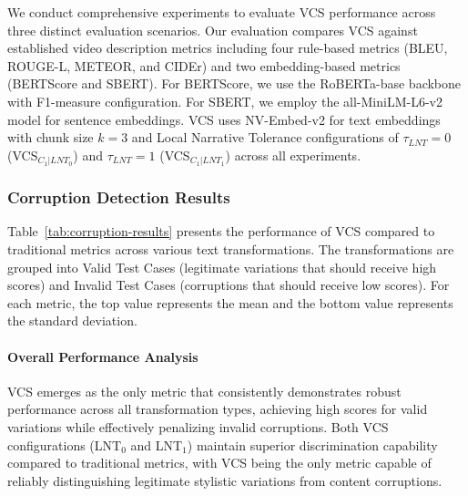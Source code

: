 \documentclass[main.tex]{subfiles}
\begin{document}
We conduct comprehensive experiments to evaluate VCS performance across three distinct evaluation scenarios. Our evaluation compares VCS against established video description metrics including four rule-based metrics (BLEU, ROUGE-L, METEOR, and CIDEr) and two embedding-based metrics (BERTScore and SBERT). For BERTScore, we use the RoBERTa-base backbone with F1-measure configuration. For SBERT, we employ the all-MiniLM-L6-v2 model for sentence embeddings. VCS uses NV-Embed-v2 for text embeddings with chunk size $k=3$ and Local Narrative Tolerance configurations of $\tau_{LNT}=0$ (VCS$_{C_1|LNT_0}$) and $\tau_{LNT}=1$ (VCS$_{C_1|LNT_1}$) across all experiments.

\subsubsection{Corruption Detection Results}

Table~\ref{tab:corruption-results} presents the performance of VCS compared to traditional metrics across various text transformations. The transformations are grouped into Valid Test Cases (legitimate variations that should receive high scores) and Invalid Test Cases (corruptions that should receive low scores). For each metric, the top value represents the mean and the bottom value represents the standard deviation.

\paragraph{Overall Performance Analysis}
VCS emerges as the only metric that consistently demonstrates robust performance across all transformation types, achieving high scores for valid variations while effectively penalizing invalid corruptions. Both VCS configurations (LNT$_0$ and LNT$_1$) maintain superior discrimination capability compared to traditional metrics, with VCS being the only metric capable of reliably distinguishing legitimate stylistic variations from content corruptions.
\end{document}
